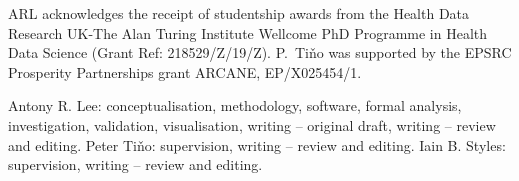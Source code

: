 \documentclass[sn-basic]{sn-jnl-arxiv}
\begin{document}
\backmatter

ARL acknowledges the receipt of studentship awards from the Health Data Research UK-The Alan Turing Institute Wellcome PhD Programme in Health Data Science (Grant Ref: 218529/Z/19/Z). P.~Ti\v{n}o was supported by the EPSRC Prosperity Partnerships grant ARCANE, EP/X025454/1.

Antony R. Lee: conceptualisation, methodology, software, formal analysis, investigation, validation, visualisation, writing -- original draft, writing -- review and editing. Peter Ti\v{n}o: supervision, writing -- review and editing. Iain B. Styles: supervision, writing -- review and editing.

\begin{appendices}


\end{appendices}


\end{document}
